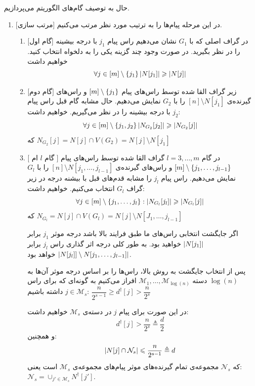 حال به توصیف گام‌های الگوریتم می‌پردازیم.
\begin{enumerate}
    \item{[مرتب سازی]}
    در این مرحله پیام‌ها را به ترتیب مورد نظر مرتب می‌کنیم.
    \begin{enumerate}
        \item{[گام اول]}
        در گراف اصلی که با
        $G_1$
        نشان می‌دهیم راس پیام
        $j_1$
        با درجه بیشینه را در نظر بگیرید. در صورت وجود چند گزینه یکی را به دلخواه انتخاب کنید. خواهیم داشت
        $$\forall j \in [m] \setminus \left\{ j_1 \right\} \left|{N[j_1]}\right| \geqslant \left|{N[j]}\right|$$
        \item{[گام دوم]}
        زیر گراف القا شده توسط راس‌های پیام
        $[m] \setminus \left\{ j_1 \right\}$
        و راس‌های گیرنده‌ی
        $[n] \setminus N[j_1]$
        را با
        $G_2$
        نمایش می‌دهیم. حال مشابه گام قبل راس پیام
        $j_2$
        با درجه بیشینه را در نظر می‌گیریم. خواهیم داشت:
        $$\forall j \in [m] \setminus \left\{ j_1, j_2 \right\} \left|{N_{G_2}[j_2]}\right| \geqslant \left|{N_{G_2}[j]}\right|$$
        که
        $N_{G_2}[j] = N[j] \cap V(G_2) = N[j] \setminus N[j_1]$
        \item{[
            گام $l$ ام
            ]}
        در گام
        $l = 3, \ldots, m$
        گراف القا شده توسط راس‌های پیام
        $[m] \setminus \left\{ j_1, \ldots, j_{l - 1} \right\}$
        و راس‌های گیرنده‌ی
        $[n] \setminus N[j_1, \ldots, j_{l-1} ]$
        را با
        $G_l$
        نمایش می‌دهیم. راس پیام
        $j_l$
        را مشابه قدم‌های قبل با بیشنه درجه در زیر گراف
        $G_l$
        انتخاب می‌کنیم. خواهیم داشت:
        $$\forall j \in [m] \setminus \left\{ j_1, \ldots, j_l \right\}: \left|{N_{G_l}[j_l]}\right| \geqslant \left|{N_{G_l} [j]}\right|$$
        که
        $N_{G_l} = N[j] \cap V(G_l) = N[j] \setminus N[J_1, \ldots, j_{l - 1}] $

        اگر جایگشت انتخابی راس‌های ما طبق فرایند بالا باشد درجه موثر
        $j_1$
        برابر
        $\left|{N[j_1]}\right|$
        خواهید بود. به طور کلی درجه اثر گذاری راس
        $j_l$
        برابر
        $\left|{N[j_l]]\setminus N[j_1, \ldots, j_{l-1}]}\right|$
        خواهد بود.

        پس از انتخاب جایگشت به روش بالا، راس‌ها را بر اساس درجه موثر آن‌ها به
        $\log(n)$
        دسته
        $\mathcal{M}_1, \ldots, \mathcal{M}_{\log(n)}$
        افراز می‌کنیم به گونه‌ای که برای راس
        $j \in \mathcal{M}_s$
        داشته باشیم:
        $\dfrac{n}{2^{s - 1}} \geq d^\dagger[j] > \dfrac{n}{2^s}$

        در این صورت برای پیام
        $j$
        در دسته‌ی
        $\mathcal{M}_s$
        خواهیم داشت:
        $$d^{\dagger}[j] > \dfrac{n}{2^s} \triangleq \dfrac{d}{2}$$
        و همچنین:
        $$\left|{N[j] \cap \mathcal{N}_s}\right| \leqslant \dfrac{n}{2^{s - 1}} \triangleq d$$
        که
        $\mathcal{N}_s$
        مجموعه‌ی تمام گیرنده‌های موثر پیام‌های مجموعه‌ی
        $\mathcal{M}_s$
        است یعنی:
        $\mathcal{N}_s = \cup_{j' \in \mathcal{M}_s} N^{\dagger}[j']$.


\end{enumerate}
\end{enumerate}
